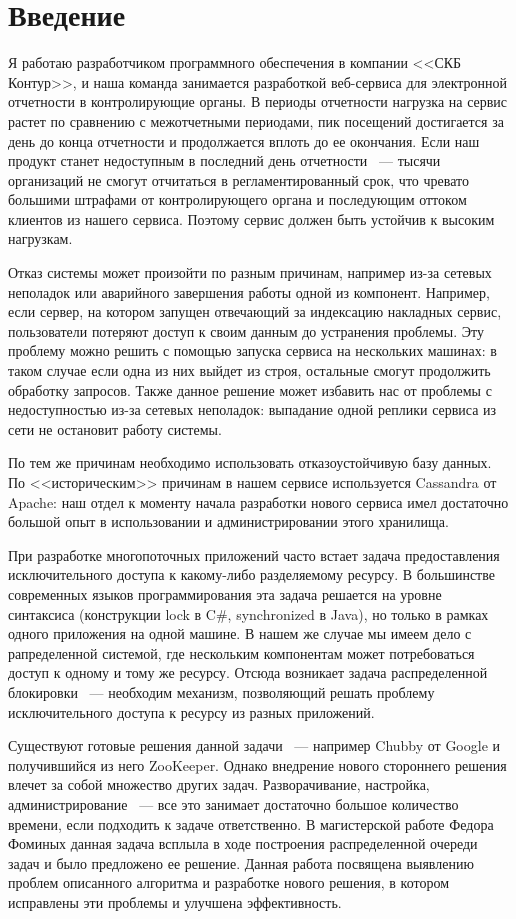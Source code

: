 \section{Введение}

Я работаю разработчиком программного обеспечения в компании <<СКБ Контур>>, и наша команда занимается разработкой веб-сервиса для электронной отчетности в контролирующие органы. В периоды отчетности нагрузка на сервис растет по сравнению с межотчетными периодами, пик посещений достигается за день до конца отчетности и продолжается вплоть до ее окончания. Если наш продукт станет недоступным в последний день отчетности ~--- тысячи организаций не смогут отчитаться в регламентированный срок, что чревато большими штрафами от контролирующего органа и последующим оттоком клиентов из нашего сервиса. Поэтому сервис должен быть устойчив к высоким нагрузкам.

Отказ системы может произойти по разным причинам, например из-за сетевых неполадок или аварийного завершения работы одной из компонент. Например, если сервер, на котором запущен отвечающий за индексацию накладных сервис, пользователи потеряют доступ к своим данным до устранения проблемы. Эту проблему можно решить с помощью запуска сервиса на нескольких машинах: в таком случае если одна из них выйдет из строя, остальные смогут продолжить обработку запросов. Также данное решение может избавить нас от проблемы с недоступностью из-за сетевых неполадок: выпадание одной реплики сервиса из сети не остановит работу системы.

По тем же причинам необходимо использовать отказоустойчивую базу данных. По <<историческим>> причинам в нашем сервисе используется Cassandra от Apache: наш отдел к моменту начала разработки нового сервиса имел достаточно большой опыт в использовании и администрировании этого хранилища.

При разработке многопоточных приложений часто встает задача предоставления исключительного доступа к какому-либо разделяемому ресурсу. В большинстве современных языков программирования эта задача решается на уровне синтаксиса (конструкции lock в C\#, synchronized в Java), но только в рамках одного приложения на одной машине. В нашем же случае мы имеем дело с рапределенной системой, где нескольким компонентам может потребоваться доступ к одному и тому же ресурсу. Отсюда возникает задача распределенной блокировки ~--- необходим механизм, позволяющий решать проблему исключительного доступа к ресурсу из разных приложений.

Существуют готовые решения данной задачи ~--- например Chubby от Google и получившийся из него ZooKeeper. Однако внедрение нового стороннего решения влечет за собой множество других задач. Разворачивание, настройка, администрирование ~--- все это занимает достаточно большое количество времени, если подходить к задаче ответственно. В магистерской работе Федора Фоминых данная задача всплыла в ходе построения распределенной очереди задач и было предложено ее решение. Данная работа посвящена выявлению проблем описанного алгоритма и разработке нового решения, в котором исправлены эти проблемы и улучшена эффективность.